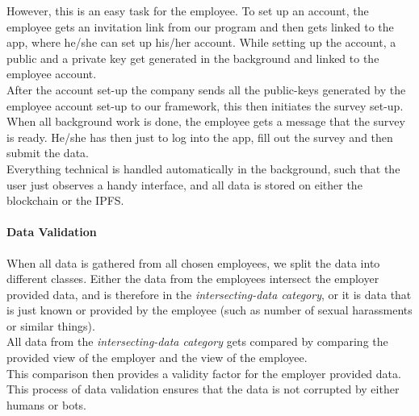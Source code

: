 However, this is an easy task for the employee. To set up an account, the employee gets an invitation link from our program and then gets linked to the app, where he/she can set up his/her account. While setting up the account, a public and a private key get generated in the background and linked to the employee account.\\
After the account set-up the company sends all the public-keys generated by the employee account set-up to our framework, this then initiates the survey set-up.\\
When all background work is done, the employee gets a message that the survey is ready. He/she has then just to log into the app, fill out the survey and then submit the data.\\

Everything technical is handled automatically in the background, such that the user just observes a handy interface, and all data is stored on either the blockchain or the IPFS.

\paragraph*{Data Validation}
When all data is gathered from all chosen employees, we split the data into different classes. Either the data from the employees intersect the employer provided data, and is therefore in the \textit{intersecting-data category}, or it is data that is just known or provided by the employee (such as number of sexual harassments or similar things).\\

All data from the \textit{intersecting-data category} gets compared by comparing the provided view of the employer and the view of the employee.\\
This comparison then provides a validity factor for the employer provided data.\\

This process of data validation ensures that the data is not corrupted by either humans or bots.\\


